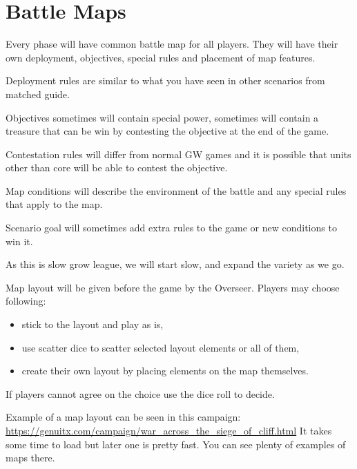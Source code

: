 \section{Battle Maps}

Every phase will have common battle map for all players. 
They will have their own deployment, objectives, special rules and placement of map features.


Deployment rules are similar to what you have seen in other scenarios from matched guide.

Objectives sometimes will contain special power, sometimes will contain a treasure that can be win by contesting the objective at the end of the game.

Contestation rules will differ from normal GW games and it is possible that units other than core will be able to contest the objective.

Map conditions will describe the environment of the battle and any special rules that apply to the map.

Scenario goal will sometimes add extra rules to the game or new conditions to win it. 

As this is slow grow league, we will start slow, and expand the variety as we go. 


Map layout will be given before the game by the Overseer.
Players may choose following:
\begin{itemize}
  \item stick to the layout and play as is,
  \item use scatter dice to scatter selected layout elements or all of them,
  \item create their own layout by placing elements on the map themselves.
\end{itemize}
If players cannot agree on the choice use the dice roll to decide.

Example of a map layout can be seen in this campaign:
\url{https://genuitx.com/campaign/war_across_the_siege_of_cliff.html}
It takes some time to load but later one is pretty fast. You can see plenty of examples of maps there.

